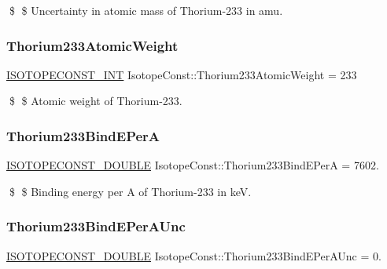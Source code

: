 \$ \$ Uncertainty in atomic mass of Thorium-\/233 in amu. \mbox{\label{group___isotope_const-_thorium-_th233_ga142fc672291f7cb40663ffbd5564dbb6}} 
\subsubsection{\texorpdfstring{Thorium233\+Atomic\+Weight}{Thorium233AtomicWeight}}
{\footnotesize\ttfamily \mbox{\hyperlink{group___isotope_const-_macros_ga5f18360b3e99483a35c32d789e62621c}{I\+S\+O\+T\+O\+P\+E\+C\+O\+N\+S\+T\+\_\+\+I\+NT}} Isotope\+Const\+::\+Thorium233\+Atomic\+Weight = 233}

\$ \$ Atomic weight of Thorium-\/233. \mbox{\label{group___isotope_const-_thorium-_th233_ga4a86657f33b71720dbc2d789277b88e2}} 
\subsubsection{\texorpdfstring{Thorium233\+Bind\+E\+PerA}{Thorium233BindEPerA}}
{\footnotesize\ttfamily \mbox{\hyperlink{group___isotope_const-_macros_ga8f45a7272ce02c0b4c65c44636ed719a}{I\+S\+O\+T\+O\+P\+E\+C\+O\+N\+S\+T\+\_\+\+D\+O\+U\+B\+LE}} Isotope\+Const\+::\+Thorium233\+Bind\+E\+PerA = 7602.}

\$ \$ Binding energy per A of Thorium-\/233 in keV. \mbox{\label{group___isotope_const-_thorium-_th233_gaa6a97500c218a232d0295fded53076c9}} 
\subsubsection{\texorpdfstring{Thorium233\+Bind\+E\+Per\+A\+Unc}{Thorium233BindEPerAUnc}}
{\footnotesize\ttfamily \mbox{\hyperlink{group___isotope_const-_macros_ga8f45a7272ce02c0b4c65c44636ed719a}{I\+S\+O\+T\+O\+P\+E\+C\+O\+N\+S\+T\+\_\+\+D\+O\+U\+B\+LE}} Isotope\+Const\+::\+Thorium233\+Bind\+E\+Per\+A\+Unc = 0.}

